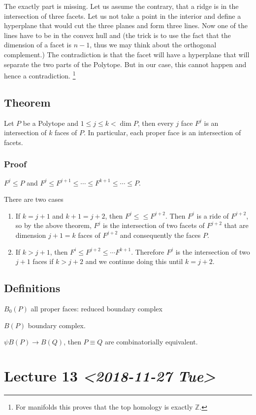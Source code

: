 \documentclass[11pt]{article}
\def\Z{\mathbb{Z}}
\begin{document}
The exactly part is missing. Let us assume the contrary, that a ridge is in
the intersection of three facets. Let us not take a point in the interior
and define a hyperplane that would cut the three planes and form three
lines. Now one of the lines have to be in the convex hull and (the trick is
to use the fact that the dimension of a facet is \(n-1\), thus we may think
about the orthogonal complement.) The contradiction is that the facet will
have a hyperplane that will separate the two parts of the Polytope. But in
our case, this cannot happen and hence a contradiction. \footnote{For manifolds this proves that the top homology is exactly \(\Z\).}
\subsection{Theorem}
\label{sec:orgeeda367}
Let \(P\) be a Polytope and \(1 \le j \le k < \dim P\), then every \(j\) face \(F^j\)
is an intersection of \(k\) faces of \(P\). In particular, each proper face is an
intersection of facets.
\subsubsection{Proof}
\label{sec:org4b4dfe3}
\(F^j \le P\) and \(F^j \le F^{j+1} \le \cdots \le F^{k+1} \le \cdots \le P\).

There are two cases

\begin{enumerate}
\item If \(k = j+1\) and \(k +1 = j+2\), then \(F^j \le \le F^{j+2}\). Then \(F^j\) is
a ride of \(F^{j+2}\), so by the above theorem, \(F^j\) is the intersection
of two facets of \(F^{j+2}\) that are dimension \(j+1 = k\) faces of
\(F^{j+2}\) and consequently the faces \(P\).
\item If \(k > j +1\), then \(F^i \le F^{j+2} \le \cdots F^{k+1}\). Therefore \(F^j\)
is the intersection of two \(j+1\) faces if \(k > j+2\) and we continue doing
this until \(k = j+2\).
\end{enumerate}
\subsection{Definitions}
\label{sec:orge55bd69}
\(B_0(P)\) all proper faces: reduced boundary complex

\(B(P)\) boundary complex.

\(\psi B(P) \rightarrow B(Q)\), then \(P \equiv Q\) are combinatorially
equivalent.
\section{Lecture 13 \textit{<2018-11-27 Tue>}}
\label{sec:orge1fdf7c}
\end{document}
